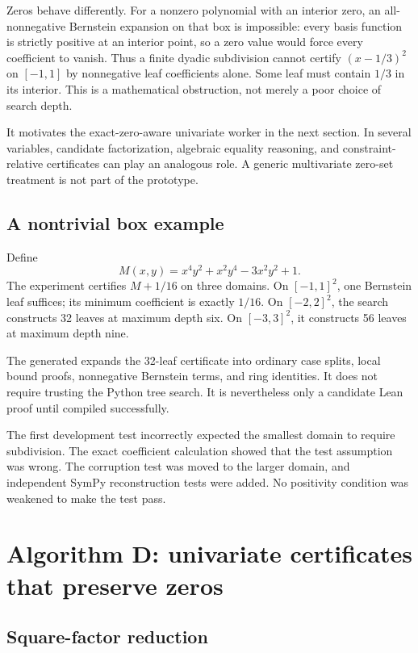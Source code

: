 Zeros behave differently. For a nonzero polynomial with an interior zero, an all-nonnegative Bernstein expansion on that box is impossible: every basis function is strictly positive at an interior point, so a zero value would force every coefficient to vanish. Thus a finite dyadic subdivision cannot certify $(x-1/3)^2$ on $[-1,1]$ by nonnegative leaf coefficients alone. Some leaf must contain $1/3$ in its interior. This is a mathematical obstruction, not merely a poor choice of search depth.

It motivates the exact-zero-aware univariate worker in the next section. In several variables, candidate factorization, algebraic equality reasoning, and constraint-relative certificates can play an analogous role. A generic multivariate zero-set treatment is not part of the prototype.

\subsection{A nontrivial box example}

Define
\[
 M(x,y)=x^4y^2+x^2y^4-3x^2y^2+1.
\]
The experiment certifies $M+1/16$ on three domains. On $[-1,1]^2$, one Bernstein leaf suffices; its minimum coefficient is exactly $1/16$. On $[-2,2]^2$, the search constructs 32 leaves at maximum depth six. On $[-3,3]^2$, it constructs 56 leaves at maximum depth nine.

The generated  expands the 32-leaf certificate into ordinary case splits, local bound proofs, nonnegative Bernstein terms, and ring identities. It does not require trusting the Python tree search. It is nevertheless only a candidate Lean proof until compiled successfully.

The first development test incorrectly expected the smallest domain to require subdivision. The exact coefficient calculation showed that the test assumption was wrong. The corruption test was moved to the larger domain, and independent SymPy reconstruction tests were added. No positivity condition was weakened to make the test pass.

\section{Algorithm D: univariate certificates that preserve zeros}

\subsection{Square-factor reduction}

